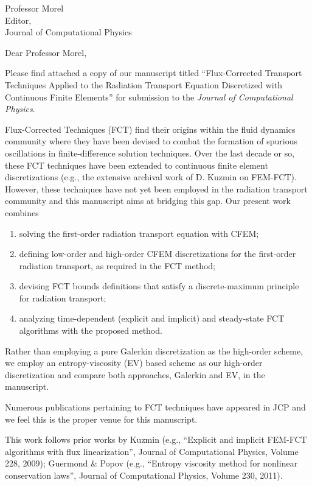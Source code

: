 \begin{letter}{Professor Morel\\
    Editor,\\
    Journal of Computational Physics}
\date{\today}

\opening{Dear Professor Morel,}
         \vspace{0.25cm}

Please find attached a copy of our manuscript titled ``Flux-Corrected Transport Techniques Applied to the Radiation Transport Equation Discretized with Continuous Finite Elements'' for submission to the {\em Journal of Computational Physics}. 

Flux-Corrected Techniques (FCT) find their origins within the fluid dynamics community where they have been devised to combat the formation of spurious oscillations in finite-difference solution techniques. Over the last decade or so, these FCT techniques have been extended to continuous finite element discretizations (e.g., the extensive archival work of D. Kuzmin on FEM-FCT). However, these techniques have not yet been employed in the radiation transport community and this manuscript aims at bridging this gap. Our present work combines 
\begin{enumerate}
\item solving the first-order radiation transport equation with CFEM;
\item defining low-order and high-order CFEM discretizations for the first-order radiation transport, as required in the FCT method;
\item devising FCT bounds definitions that satisfy a discrete-maximum principle for radiation transport;
\item analyzing time-dependent (explicit and implicit) and steady-state FCT algorithms with the proposed method.
\end{enumerate}
%
Rather than employing a pure Galerkin discretization as the high-order scheme, we employ an entropy-viscosity (EV) based scheme as our high-order discretization and compare both approaches,
Galerkin and EV, in the manuscript.

Numerous publications pertaining to FCT techniques have appeared in JCP and we feel this is
the proper venue for this manuscript.

This work follows prior works by Kuzmin (e.g., 
``Explicit and implicit FEM-FCT algorithms with flux linearization'',
Journal of Computational Physics, Volume 228, 2009); Guermond \& Popov 
(e.g., ``Entropy viscosity method for nonlinear conservation laws'', 
Journal of Computational Physics, Volume 230, 2011).



\end{letter}
